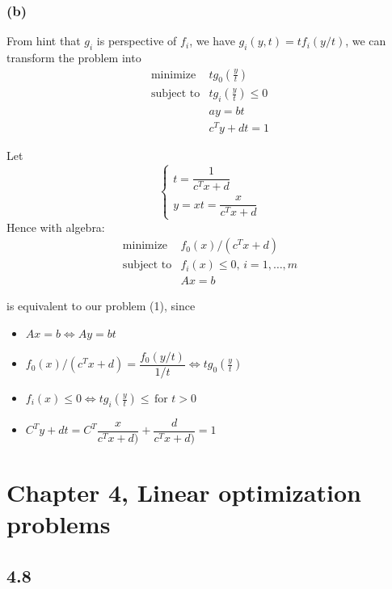 \documentclass{article}
\begin{document}
    \subsubsection*{(b)}
From hint that $g_i$ is perspective of $f_i$, we have $g_i(y,t) = tf_i(y/t)$, we can transform the problem into \begin{equation}
   \begin{array}{ll}
    \mbox{minimize}   & tg_0(\frac{y}{t}) \\
    \mbox{subject to} & tg_i(\frac{y}{t}) \le 0 \\
    & ay = bt \\
    & c^Ty + dt =1
        \end{array}
\end{equation}

Let 
\[\begin{cases}
           t = \dfrac{1}{c^Tx + d} \\
           y = xt = \dfrac{x}{c^Tx + d} 
        \end{cases}\]
        Hence with algebra: \begin{equation}
  \begin{array}{ll}
    \mbox{minimize}   &  f_0(x)/(c^Tx + d) \\
    \mbox{subject to} & f_i(x) \le 0, \, i = 1,\dots ,m\\
    & Ax = b
        \end{array}
 \end{equation}

  is equivalent to our problem (1), since 
 \begin{itemize}

  \item $ A x = b \Longleftrightarrow Ay= bt$
  \item $f_0(x)/(c^Tx + d)  = \dfrac{f_0(y/t)}{1/t} \Longleftrightarrow  tg_0(\frac{y}{t}) $
  \item   $f_i(x) \le 0 \Longleftrightarrow  tg_i(\frac{y}{t}) \le \, \mbox{for } t > 0 $
 \item  $C^T y + dt = C^T\dfrac{x}{c^Tx + d)} + \dfrac{d}{c^Tx + d)}  = 1$
 \end{itemize}
 

\section*{Chapter 4, Linear optimization problems}	

   \subsection*{4.8  }
\end{document}
